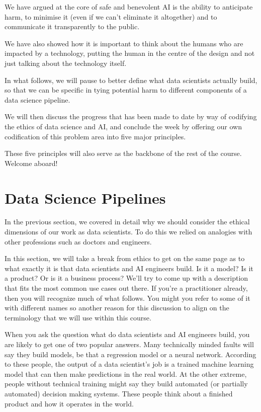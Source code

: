 \documentclass[
]{book}
\theoremstyle{definition}
\theoremstyle{definition}
\theoremstyle{definition}
\theoremstyle{definition}
\theoremstyle{remark}
\begin{document}
We have argued at the core of safe and benevolent AI is the ability to anticipate
harm, to minimise it (even if we can't eliminate it altogether) and to communicate it transparently to the public.

We have also showed how it is important to think about the humans who are impacted by a technology, putting the human in the centre of the design and
not just talking about the technology itself.

In what follows, we will pause to better define what data scientists actually build, so that we can be specific in tying potential harm to different components of a data science pipeline.

We will then discuss the progress that has been made to date by way of codifying the ethics of data science and AI, and conclude the week by offering our own codification of this problem area into five major principles.

These five principles will also serve as the backbone of the rest of the course. Welcome aboard!

\hypertarget{data-science-pipelines}{%
\section{Data Science Pipelines}\label{data-science-pipelines}}

In the previous section, we covered in detail why we should consider the ethical dimensions of our work as data scientists. To do this we relied on analogies with other professions such as doctors and engineers.

In this section, we will take a break from ethics to get on the same page as to what exactly it is that data scientists and AI engineers build. Is it a model? Is it a product? Or is it a business process? We'll try to come up with a description that fits the most common use cases out there. If you're a practitioner already, then you will recognize much of what follows. You might you refer to some of it with different names so another reason for this discussion to align on the terminology that we will use within this course.

When you ask the question what do data scientists and AI engineers build, you are likely to get one of two popular answers. Many technically minded faults will say they build models, be that a regression model or a neural network. According to these people, the output of a data scientist's job is a trained machine learning model that can then make predictions in the real world. At the other extreme, people without technical training might say they build automated (or partially automated) decision making systems. These people think about a finished product and how it operates in the world.
\end{document}
